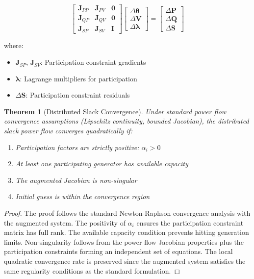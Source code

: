 \documentclass[11pt]{article}
\newtheorem{theorem}{Theorem}
\begin{document}
\begin{equation}
\begin{bmatrix}
\mathbf{J}_{PP} & \mathbf{J}_{PV} & \mathbf{0} \\
\mathbf{J}_{QP} & \mathbf{J}_{QV} & \mathbf{0} \\
\mathbf{J}_{SP} & \mathbf{J}_{SV} & \mathbf{I}
\end{bmatrix}
\begin{bmatrix}
\Delta \boldsymbol{\theta} \\
\Delta \mathbf{V} \\
\Delta \boldsymbol{\lambda}
\end{bmatrix}
=
\begin{bmatrix}
\Delta \mathbf{P} \\
\Delta \mathbf{Q} \\
\Delta \mathbf{S}
\end{bmatrix}
\end{equation}

where:
\begin{itemize}
    \item $\mathbf{J}_{SP}$, $\mathbf{J}_{SV}$: Participation constraint gradients
    \item $\boldsymbol{\lambda}$: Lagrange multipliers for participation
    \item $\Delta \mathbf{S}$: Participation constraint residuals
\end{itemize}

\begin{theorem}[Distributed Slack Convergence]
Under standard power flow convergence assumptions (Lipschitz continuity, bounded Jacobian), the distributed slack power flow converges quadratically if:
\begin{enumerate}
    \item Participation factors are strictly positive: $\alpha_i > 0$
    \item At least one participating generator has available capacity
    \item The augmented Jacobian is non-singular
    \item Initial guess is within the convergence region
\end{enumerate}
\end{theorem}

\begin{proof}
The proof follows the standard Newton-Raphson convergence analysis with the augmented system. The positivity of $\alpha_i$ ensures the participation constraint matrix has full rank. The available capacity condition prevents hitting generation limits. Non-singularity follows from the power flow Jacobian properties plus the participation constraints forming an independent set of equations. The local quadratic convergence rate is preserved since the augmented system satisfies the same regularity conditions as the standard formulation.
\end{proof}
\end{document}
